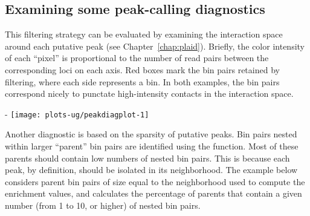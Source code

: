 \documentclass{report}\usepackage[]{graphicx}\usepackage[usenames,dvipsnames]{color}
\makeatletter
\def\maxwidth{ %
  \ifdim\Gin@nat@width>\linewidth
    \linewidth
  \else
    \Gin@nat@width
  \fi
}
\newcommand{\hlnum}[1]{\textcolor[rgb]{0.816,0.125,0.439}{#1}}%
\newcommand{\hlstr}[1]{\textcolor[rgb]{0.251,0.627,0.251}{#1}}%
\newcommand{\hlcom}[1]{\textcolor[rgb]{0.502,0.502,0.502}{\textit{#1}}}%
\newcommand{\hlopt}[1]{\textcolor[rgb]{0,0,0}{#1}}%
\newcommand{\hlstd}[1]{\textcolor[rgb]{0.251,0.251,0.251}{#1}}%
\newcommand{\hlkwb}[1]{\textcolor[rgb]{0,0,0}{#1}}%
\newcommand{\hlkwc}[1]{\textcolor[rgb]{0.251,0.251,0.251}{#1}}%
\newcommand{\hlkwd}[1]{\textcolor[rgb]{0.878,0.439,0.125}{#1}}%
\newenvironment{knitrout}{}{} %
\makeatother
\begin{document}
\subsection{Examining some peak-calling diagnostics}
This filtering strategy can be evaluated by examining the interaction space around each putative peak (see Chapter~\ref{chap:plaid}).
Briefly, the color intensity of each ``pixel'' is proportional to the number of read pairs between the corresponding loci on each axis.
Red boxes mark the bin pairs retained by filtering, where each side represents a bin.
In both examples, the bin pairs correspond nicely to punctate high-intensity contacts in the interaction space.

\begin{knitrout}
\color{fgcolor}\begin{adjustwidth}{0mm}{-\fltoffset}
\texttt{[image: plots-ug/peakdiagplot-1]} \end{adjustwidth}
\end{knitrout}

Another diagnostic is based on the sparsity of putative peaks.
Bin pairs nested within larger ``parent'' bin pairs are identified using the  function.
Most of these parents should contain low numbers of nested bin pairs.
This is because each peak, by definition, should be isolated in its neighborhood.
The example below considers parent bin pairs of size equal to the neighborhood used to compute the enrichment values,
and calculates the percentage of parents that contain a given number (from 1 to 10, or higher) of nested bin pairs.

\begin{knitrout}
\color{fgcolor}
\end{knitrout}
\end{document}
